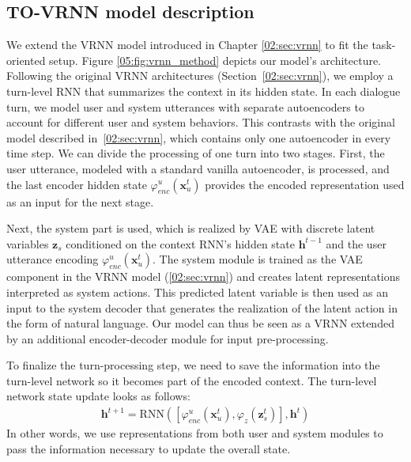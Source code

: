 \subsection{TO-VRNN model description}
\label{05:sec:vrnn-model}
We extend the VRNN model introduced in Chapter \ref{02:sec:vrnn} to fit the task-oriented setup.
Figure \ref{05:fig:vrnn_method} depicts our model's architecture.
Following the original VRNN architectures (Section~\ref{02:sec:vrnn}), we employ a turn-level RNN that summarizes the context in its hidden state.
In each dialogue turn, we model user and system utterances with separate autoencoders to account for different user and system behaviors.
This contrasts with the original model described in~\ref{02:sec:vrnn}, which contains only one autoencoder in every time step.
We can divide the processing of one turn into two stages.
First, the user utterance, modeled with a standard vanilla autoencoder, is processed, and the last encoder hidden state $\varphi^u_{enc}(\mathbf{x}^t_u)$ provides the encoded representation used as an input for the next stage.

Next, the system part is used, which is realized by VAE with discrete latent variables $\textbf{z}_s$ conditioned on the context RNN's hidden state $\mathbf{h}^{t-1}$ and the user utterance encoding $\varphi^u_{enc}(\mathbf{x}^t_u)$.
The system module is trained as the VAE component in the VRNN model (\ref{02:sec:vrnn}) and creates latent representations interpreted as system actions.
This predicted latent variable is then used as an input to the system decoder that generates the realization of the latent action in the form of natural language.
Our model can thus be seen as a VRNN extended by an additional encoder-decoder module for input pre-processing.

To finalize the turn-processing step, we need to save the information into the turn-level network so it becomes part of the encoded context.
The turn-level network state update looks as follows:
\begin{equation}
    \begin{gathered}
        \mathbf{h}^{t+1} = \text{RNN}([\varphi^u_{enc}(\mathbf{x}_u^t),\varphi_{z}(\mathbf{z}^t_s)], \mathbf{h}^t)
    \end{gathered}
\end{equation}
In other words, we use representations from both user and system modules to pass the information necessary to update the overall state.


